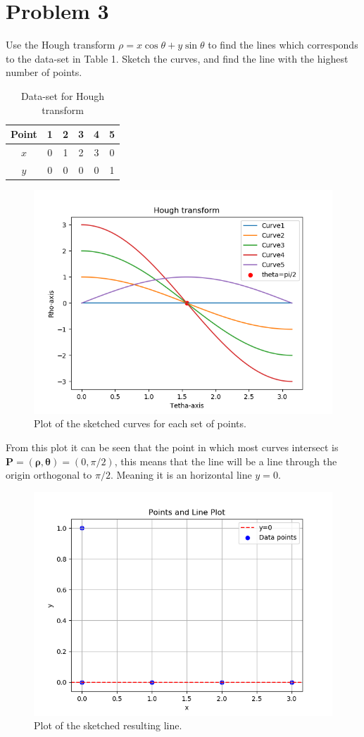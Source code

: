 \documentclass[12pt, letterpaper]{article}
\begin{document}
\section*{\large Problem 3}
Use the Hough transform $\rho=x\cos\theta+y\sin\theta$ to find the lines
which corresponds to the data-set in Table 1. Sketch the curves, and find the line
with the highest number of points.
\begin{table}[ht]
    \centering
    \begin{tabular}{|c|c c c c c|}
        \hline
        Point & 1 & 2 & 3 & 4 & 5\\
        \hline
        $x$ & 0 & 1 & 2 & 3 & 0\\
        $y$ & 0 & 0 & 0 & 0 & 1\\
        \hline
    \end{tabular}
    \caption{Data-set for Hough transform} 
\end{table}
\begin{figure}[ht]
    \centering
    \includegraphics[width=0.8\linewidth]{Figure_1.png} %
    \caption{Plot of the sketched curves for each set of points.}
  \end{figure}
  From this plot it can be seen that the point in which most curves intersect
  is $\bm{P=(\rho,\theta)}=(0,\pi/2)$, this means that the line will be a line 
  through the origin orthogonal to $\pi/2$. Meaning it is an horizontal line $y=0$.
  \newpage
  \begin{figure}[ht]
    \centering
    \includegraphics[width=0.8\linewidth]{Figure_2.png} %
    \caption{Plot of the sketched resulting line.}
  \end{figure}
\end{document}
